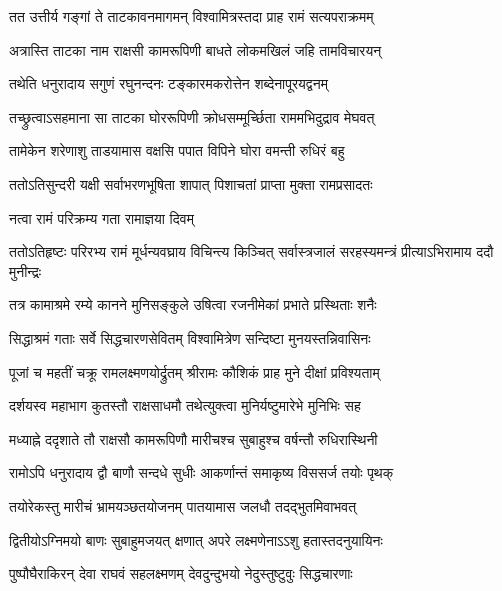 \twolineshloka
{तत उत्तीर्य गङ्गां ते ताटकावनमागमन्}
{विश्वामित्रस्तदा प्राह रामं सत्यपराक्रमम्} %

\twolineshloka
{अत्रास्ति ताटका नाम राक्षसी कामरूपिणी}
{बाधते लोकमखिलं जहि तामविचारयन्} %

\twolineshloka
{तथेति धनुरादाय सगुणं रघुनन्दनः}
{टङ्कारमकरोत्तेन शब्देनापूरयद्वनम्} %

\twolineshloka
{तच्छ्रुत्वाऽसहमाना सा ताटका घोररूपिणी}
{क्रोधसम्मूर्च्छिता राममभिदुद्राव मेघवत्} %

\twolineshloka
{तामेकेन शरेणाशु ताडयामास वक्षसि}
{पपात विपिने घोरा वमन्ती रुधिरं बहु} %

\twolineshloka
{ततोऽतिसुन्दरी यक्षी सर्वाभरणभूषिता}
{शापात् पिशाचतां प्राप्ता मुक्ता रामप्रसादतः} %

\onelineshloka
{नत्वा रामं परिक्रम्य गता रामाज्ञया दिवम्} %

\fourlineindentedshloka
{ततोऽतिहृष्टः परिरभ्य रामं}
{मूर्धन्यवघ्राय विचिन्त्य किञ्चित्}
{सर्वास्त्रजालं सरहस्यमन्त्रं}
{प्रीत्याऽभिरामाय ददौ मुनीन्द्रः} %




\twolineshloka
{तत्र कामाश्रमे रम्ये कानने मुनिसङ्कुले}
{उषित्वा रजनीमेकां प्रभाते प्रस्थिताः शनैः} %

\twolineshloka
{सिद्धाश्रमं गताः सर्वे सिद्धचारणसेवितम्}
{विश्वामित्रेण सन्दिष्टा मुनयस्तन्निवासिनः} %

\twolineshloka
{पूजां च महतीं चक्रू रामलक्ष्मणयोर्द्रुतम्}
{श्रीरामः कौशिकं प्राह मुने दीक्षां प्रविश्यताम्} %

\twolineshloka
{दर्शयस्व महाभाग कुतस्तौ राक्षसाधमौ}
{तथेत्युक्त्वा मुनिर्यष्टुमारेभे मुनिभिः सह} %

\twolineshloka
{मध्याह्ने ददृशाते तौ राक्षसौ कामरूपिणौ}
{मारीचश्च सुबाहुश्च वर्षन्तौ रुधिरास्थिनी} %

\twolineshloka
{रामोऽपि धनुरादाय द्वौ बाणौ सन्दधे सुधीः}
{आकर्णान्तं समाकृष्य विससर्ज तयोः पृथक्} %

\twolineshloka
{तयोरेकस्तु मारीचं भ्रामयञ्छतयोजनम्}
{पातयामास जलधौ तदद्भुतमिवाभवत्} %

\twolineshloka
{द्वितीयोऽग्निमयो बाणः सुबाहुमजयत् क्षणात्}
{अपरे लक्ष्मणेनाऽऽशु हतास्तदनुयायिनः} %

\twolineshloka
{पुष्पौघैराकिरन् देवा राघवं सहलक्ष्मणम्}
{देवदुन्दुभयो नेदुस्तुष्टुवुः सिद्धचारणाः} %

